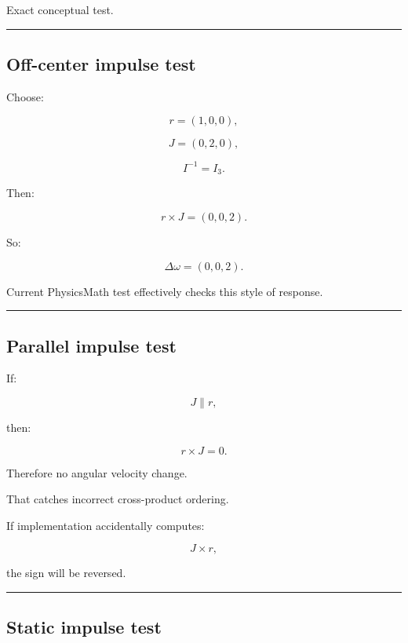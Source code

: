 Exact conceptual test.

\begin{center}\rule{0.5\linewidth}{0.5pt}\end{center}

\subsection{Off-center impulse test}\label{06-engine-ii-ch039-off-center-impulse-test}

\hypertarget{06-engine-ii-ch039-off-center-impulse-test}{}

Choose:

\[
r=(1,0,0),
\]

\[
J=(0,2,0),
\]

\[
I^{-1}=I_3.
\]

Then:

\[
r\times J
=
(0,0,2).
\]

So:

\[
\Delta\omega=(0,0,2).
\]

Current PhysicsMath test effectively checks this style of response.

\begin{center}\rule{0.5\linewidth}{0.5pt}\end{center}

\subsection{Parallel impulse test}\label{06-engine-ii-ch039-parallel-impulse-test}

\hypertarget{06-engine-ii-ch039-parallel-impulse-test}{}

If:

\[
J\parallel r,
\]

then:

\[
r\times J=0.
\]

Therefore no angular velocity change.

That catches incorrect cross-product ordering.

If implementation accidentally computes:

\[
J\times r,
\]

the sign will be reversed.

\begin{center}\rule{0.5\linewidth}{0.5pt}\end{center}

\subsection{Static impulse test}\label{06-engine-ii-ch039-static-impulse-test}

